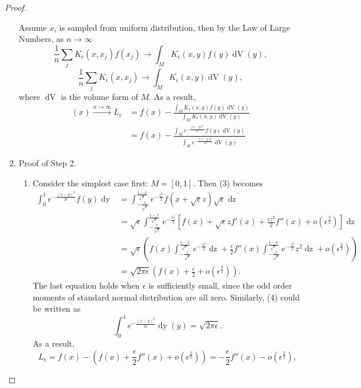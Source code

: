 \documentclass[11pt]{article}
\newcommand\<{\langle}
\renewcommand\>{\rangle}
\begin{document}
\begin{proof}
\begin{enumerate}
Assume $x_i$ is  sampled from uniform distribution, then by the Law of Large Numbers, as $n\rightarrow \infty$
\begin{equation}
\frac{1}{n}\sum_j K_\epsilon(x,x_j)f(x_j)\rightarrow\int_M K_\epsilon(x,y)f(y)\operatorname{dV}(y),
\end{equation}
\begin{equation}\frac{1}{n}\sum_j K_\epsilon(x,x_j)\rightarrow\int_M K_\epsilon(x,y)\operatorname{dV}(y),\end{equation}
where $\operatorname{dV}$ is the volume form of $M$. As a result, 
\begin{align*}
[\bar{L}_{n,\epsilon}f](x)\xrightarrow[]{\text{$n\rightarrow\infty$}}L_\epsilon &=f(x)-\frac{\int_M K_\epsilon(x,y)f(y)\operatorname{dV}(y)}{\int_M K_\epsilon(x,y)\operatorname{dV}(y)}\\
&=f(x)-\frac{\int_M e^{-\frac{\|x-y\|^2}{2\epsilon}}f(y)\operatorname{dV}(y)}{\int_M e^{-\frac{\|x-y\|^2}{2\epsilon}}\operatorname{dV}(y)}
\end{align*}
\item Proof of Step 2.\\
\begin{enumerate}
\item Consider the simplest case first: $M=[0,1]$. Then (3) becomes
\begin{align*}
\int_0^1 e^{-\frac{(x-y)^2}{2\epsilon}}f(y)\operatorname{dy}&=\int_{-\frac{x}{\sqrt\epsilon}}^\frac{1-x}{\sqrt\epsilon} {e^{-\frac{z^2}{2}}}f(x+\sqrt{\epsilon}z)\sqrt{\epsilon}\operatorname{dz}\\
&=\sqrt\epsilon \int_{-\frac{x}{\sqrt\epsilon}}^\frac{1-x}{\sqrt\epsilon} {e^{-\frac{z^2}{2}}}[f(x)+\sqrt\epsilon zf'(x)+\frac{\epsilon z^2}{2}f''(x)+o(\epsilon^{\frac{3}{2}})]\operatorname{dz}\\
&=\sqrt\epsilon (f(x)\int_{-\frac{x}{\sqrt\epsilon}}^\frac{1-x}{\sqrt\epsilon} e^{-\frac{z^2}{2}}\operatorname{dz}+\frac{\epsilon}{2}f''(x)\int_{-\frac{x}{\sqrt\epsilon}}^\frac{1-x}{\sqrt\epsilon} e^{-\frac{z^2}{2}}z^2\operatorname{dz}+o(\epsilon^{\frac{3}{2}}))\\
&=\sqrt{2\pi\epsilon} (f(x)+\frac{\epsilon}{2}+o(\epsilon^{\frac{3}{2}})).
\end{align*}
The last equation holds when $\epsilon$ is sufficiently small, since the odd order moments of standard normal distribution are all zero. Similarly, (4) could be written as
$$\int_0^1 e^{-\frac{(x-y)^2}{2\epsilon}}\operatorname{dy}(y)=\sqrt{2\pi\epsilon}.$$
As a result,
$$L_\epsilon=f(x)-(f(x)+\frac{\epsilon}{2}f''(x)+o(\epsilon^{\frac{3}{2}}))=-\frac{\epsilon}{2}f''(x)-o(\epsilon^{\frac{3}{2}}),$$

\end{enumerate}
\end{enumerate}
\end{proof}
\end{document}
